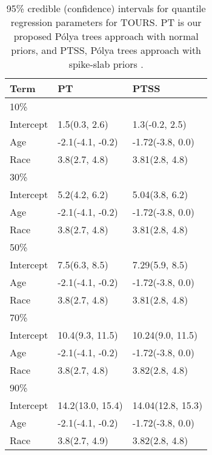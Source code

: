 \documentclass[12pt]{article}
\newcommand{\polya}{P\'{o}lya}
\begin{document}
\begin{table}[h]
  \caption[]{\label{ch2:tab:tours} 95\% credible (confidence) intervals for
    quantile regression parameters for TOURS.
    PT is our proposed \polya{} trees approach with normal priors, and PTSS,
    \polya{} trees approach with spike-slab priors .}
  \vspace{4mm}

  \centering
  \begin{tabular}[tb]{lll}
    \toprule
    Term      & PT                  & PTSS                \\
    \hline
    10\%      &                     &                     \\
    Intercept & 1.5(0.3, 2.6)       & 1.3(-0.2, 2.5)   \\
    Age       & -2.1(-4.1, -0.2) & -1.72(-3.8, 0.0)  \\
    Race      & 3.8(2.7, 4.8)    & 3.81(2.8, 4.8)    \\
    30\%      &                     &                     \\
    Intercept & 5.2(4.2, 6.2)    & 5.04(3.8, 6.2)    \\
    Age       & -2.1(-4.1, -0.2) & -1.72(-3.8, 0.0)  \\
    Race      & 3.8(2.7, 4.8)    & 3.81(2.8, 4.8)    \\
    50\%      &                     &                     \\
    Intercept & 7.5(6.3, 8.5)    & 7.29(5.9, 8.5)    \\
    Age       & -2.1(-4.1, -0.2) & -1.72(-3.8, 0.0)  \\
    Race      & 3.8(2.7, 4.8)    & 3.81(2.8, 4.8)    \\
    70\%      &                     &                     \\
    Intercept & 10.4(9.3, 11.5)  & 10.24(9.0, 11.5)  \\
    Age       & -2.1(-4.1, -0.2) & -1.72(-3.8, 0.0)  \\
    Race      & 3.8(2.7, 4.8)    & 3.82(2.8, 4.8)    \\
    90\%      &                     &                     \\
    Intercept & 14.2(13.0, 15.4) & 14.04(12.8, 15.3) \\
    Age       & -2.1(-4.1, -0.2) & -1.72(-3.8, 0.0)  \\
    Race      & 3.8(2.7, 4.9)    & 3.82(2.8, 4.8)    \\
    \bottomrule
  \end{tabular}
\end{table}
\end{document}
